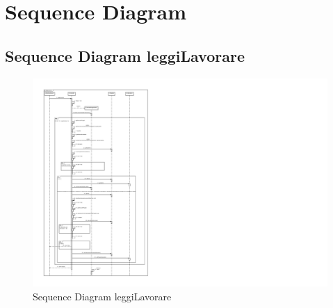 \chapter{Sequence Diagram}
    \section{Sequence Diagram leggiLavorare}
        \begin{figure}[htbp!]
            \centering
                \vspace{2\baselineskip}
                \includegraphics[width=1.3\linewidth]{Immagini/Diagrammi/Sequence Diagram/Sequence Diagram leggiLavorare.pdf}
            \caption{Sequence Diagram leggiLavorare}
            \label{fig:Sequence Diagram leggiLavorare}
        \end{figure}

    \newpage

